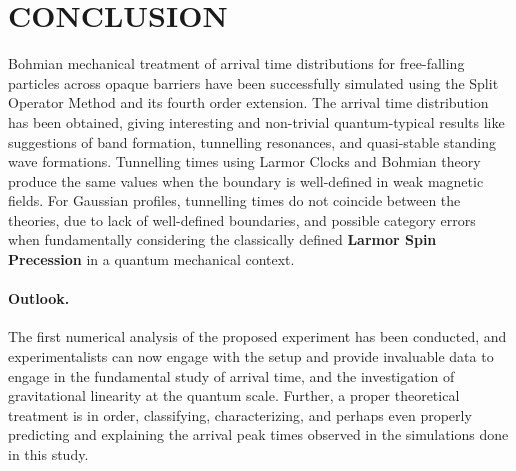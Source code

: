 \section{CONCLUSION}

Bohmian mechanical treatment of arrival time distributions for free-falling particles across opaque barriers have been successfully simulated using the Split Operator Method and its fourth order extension. The arrival time distribution has been obtained, giving interesting and non-trivial quantum-typical results like suggestions of band formation, tunnelling resonances, and quasi-stable standing wave formations. Tunnelling times using Larmor Clocks and Bohmian theory produce the same values when the boundary is well-defined in weak magnetic fields. For Gaussian profiles, tunnelling times do not coincide between the theories, due to lack of well-defined boundaries, and possible category errors when fundamentally considering the classically defined \textbf{Larmor Spin Precession} in a quantum mechanical context.
\paragraph{Outlook.} The first numerical analysis of the proposed experiment has been conducted, and experimentalists can now engage with the setup and provide invaluable data to engage in the fundamental study of arrival time, and the investigation of gravitational linearity at the quantum scale. Further, a proper theoretical treatment is in order, classifying, characterizing, and perhaps even properly predicting and explaining the arrival peak times observed in the simulations done in this study.